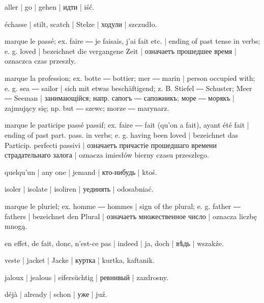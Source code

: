 \begin{outdent}{1em}
aller | go | gehen | идти | iść.

\uvsubentry{}
échasse | stilt, scatch | Stelze | ходули | szczudło.

marque le passé; ex.  faire ―  je faisais,
j’ai fait etc. | ending of past tense in verbs; e. g.  loved | bezeichnet die vergangene Zeit | означаетъ прошедшее время | oznaczca
czas przeszły.

marque la profession; ex.  botte ―  bottier;
 mer ―  marin | person occupied with; e. g.  sea
―  sailor | sich mit etwas beschäftigend; z. B. 
Stiefel ―  Schuster;  Meer ―  Seeman | занимающійся; напр.  сапогъ ―  сапожникъ; 
море ―  морякъ | zajmujący się; np.  but ―
 szewc;  morze ―  marynarz.

marque le participe passé passif; ex.  faire ― 
fait (qu’on a fait), ayant été fait | ending of past part. pass. in
verbs; e. g.  having been loved | bezeichnet das
Particip. perfecti passivi | означаетъ причастіе прошедшаго времени
страдательнаго залога | oznacza imiesłów bierny czasu przeszłego.

quelqu’un | any one | jemand | кто-нибудь | ktoś.

isoler | isolate | isoliren | уединять | odosabniać.


marque le pluriel; ex.  homme ―  hommes | sign
of the plural; e. g.  father ―  fathers | bezeichnet den Plural | означаетъ множественное число | oznacza liczbę
mnogą.

en effet, de fait, donc, n’est-ce pas | indeed | ja, doch | вѣдь | wszakźe.

veste | jacket | Jacke | куртка | kurtka, kaftanik.

jaloux | jealous | eifersüchtig | ревнивый | zazdrosny.

déjà | already | schon | уже | juź.


\end{outdent}
